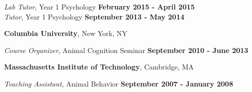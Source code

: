 \documentclass[margin,line]{res}
\begin{document}
\begin{resume}
\vspace{-.4cm}
{\em Lab Tutor}, Year 1 Psychology \hfill {\bf February 2015 - April 2015}\\

\vspace{-.4cm}
{\em Tutor}, Year 1 Psychology \hfill {\bf September 2013 - May 2014}\\
\vspace{-.3cm}


{\bf Columbia University}, New York, NY

\vspace{-.2cm}
{\em Course Organizer}, Animal Cognition Seminar \hfill {\bf September 2010 - June 2013}\\
\vspace{-.5cm}


{\bf Massachusetts Institute of Technology}, Cambridge, MA

\vspace{-.2cm}
{\em Teaching Assistant}, Animal Behavior \hfill {\bf September 2007 - January 2008}\\
\vspace{-.5cm}




\vspace{.5cm}



\end{resume}
\end{document}
